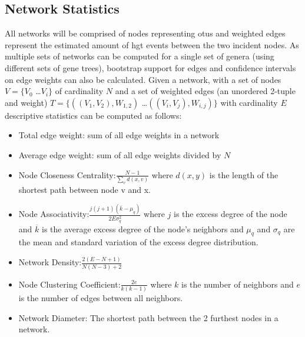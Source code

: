 \documentclass[12pt,letter]{article}
\begin{document}
\subsection*{Network Statistics}
All networks will be comprised of nodes representing \ac{otu}s and weighted edges represent the estimated amount of \ac{hgt} events between the two incident nodes.
As multiple sets of networks can be computed for a single set of genera (using different sets of gene trees), bootstrap support for edges and confidence intervals on edge weights can also be calculated.
Given a network, with a set of nodes $V = \{V_0$ \dots $V_i\}$ of cardinality $N$ and a set of weighted edges (an unordered 2-tuple and weight) $T = \{((V_1,V_2),W_{1,2})$ \dots $((V_i,V_j),W_{i,j})\}$ with cardinality $E$ descriptive statistics can be computed as follows\citep{netstat}:
\begin{itemize}
    \item Total edge weight: sum of all edge weights in a network
    \item Average edge weight: sum of all edge weights divided by $N$
    \item Node Closeness Centrality:$ \frac{N-1}{\sum_v d(x,v)}$ where $d(x,y)$ is the length of the shortest path between node v and x.
    \item Node Associativity:$ \frac{j(j+1)(\overline{k}-\mu_q)}{2E\sigma^2_q}$ where $j$ is the excess degree of the node and $\overline{k}$ is the average excess degree of the node's neighbors and $\mu_q$ and $\sigma_q$ are the mean and standard variation of the excess degree distribution.
    \item Network Density:$ \frac{2(E-N+1)}{N(N-3)+2}$
    \item Node Clustering Coefficient:$ \frac{2e}{k(k-1)}$ where $k$ is the number of neighbors and $e$ is the number of edges between all neighbors.
    \item Network Diameter: The shortest path between the 2 furthest nodes in a network.
\end{itemize}
\end{document}
